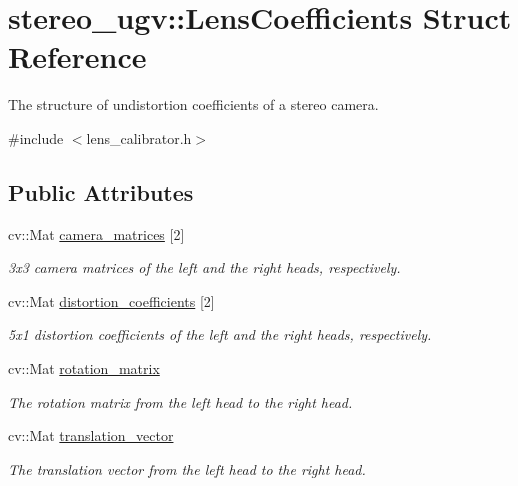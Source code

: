 \hypertarget{structstereo__ugv_1_1LensCoefficients}{}\section{stereo\+\_\+ugv\+:\+:Lens\+Coefficients Struct Reference}
\label{structstereo__ugv_1_1LensCoefficients}


The structure of undistortion coefficients of a stereo camera.  




{\ttfamily \#include $<$lens\+\_\+calibrator.\+h$>$}

\subsection*{Public Attributes}
\begin{DoxyCompactItemize}
\item 
\mbox{\label{structstereo__ugv_1_1LensCoefficients_a5508e7d6d3dc52cbe79451ab65673e2e}} 
cv\+::\+Mat \hyperlink{structstereo__ugv_1_1LensCoefficients_a5508e7d6d3dc52cbe79451ab65673e2e}{camera\+\_\+matrices} \mbox{[}2\mbox{]}
\begin{DoxyCompactList}\small\item\em 3x3 camera matrices of the left and the right heads, respectively. \end{DoxyCompactList}\item 
cv\+::\+Mat \hyperlink{structstereo__ugv_1_1LensCoefficients_a5fcc432a6c105509aaea4fe293a3352d}{distortion\+\_\+coefficients} \mbox{[}2\mbox{]}
\begin{DoxyCompactList}\small\item\em 5x1 distortion coefficients of the left and the right heads, respectively. \end{DoxyCompactList}\item 
\mbox{\label{structstereo__ugv_1_1LensCoefficients_a659e8f3117f5dedea0fb74a4d6065f27}} 
cv\+::\+Mat \hyperlink{structstereo__ugv_1_1LensCoefficients_a659e8f3117f5dedea0fb74a4d6065f27}{rotation\+\_\+matrix}
\begin{DoxyCompactList}\small\item\em The rotation matrix from the left head to the right head. \end{DoxyCompactList}\item 
\mbox{\label{structstereo__ugv_1_1LensCoefficients_a60ab9feaa811aa39f62da750dd76f239}} 
cv\+::\+Mat \hyperlink{structstereo__ugv_1_1LensCoefficients_a60ab9feaa811aa39f62da750dd76f239}{translation\+\_\+vector}
\begin{DoxyCompactList}\small\item\em The translation vector from the left head to the right head. \end{DoxyCompactList}\end{DoxyCompactItemize}


